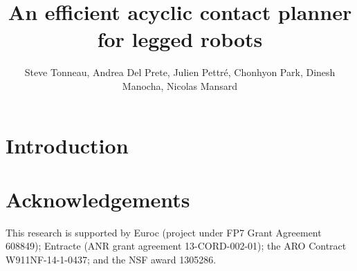 \documentclass[shortAfour,sageh]{sagej}
\begin{document}

\title{An efficient acyclic contact planner for legged robots}

\author{Steve Tonneau, Andrea Del Prete, Julien Pettr\'e, Chonhyon Park, Dinesh Manocha, Nicolas Mansard}



\begin{abstract}
	
\end{abstract}


\maketitle

\section{Introduction}






\section*{Acknowledgements}
This research is supported by Euroc (project under FP7 Grant Agreement  608849);  Entracte (ANR  grant  agreement  13-CORD-002-01);
the ARO Contract W911NF-14-1-0437; and the NSF award 1305286. %





\appendix






\end{document}
